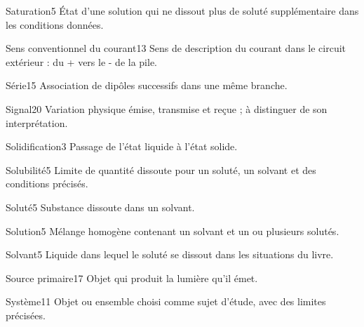 \documentclass[12pt,twoside,openany]{book}
\begin{document}
\begin{pcLexique}{Saturation}{5}
État d’une solution qui ne dissout plus de soluté supplémentaire dans les conditions données.\par
\end{pcLexique}
\begin{pcLexique}{Sens conventionnel du courant}{13}
Sens de description du courant dans le circuit extérieur : du + vers le - de la pile.\par
\end{pcLexique}
\begin{pcLexique}{Série}{15}
Association de dipôles successifs dans une même branche.\par
\end{pcLexique}
\begin{pcLexique}{Signal}{20}
Variation physique émise, transmise et reçue ; à distinguer de son interprétation.\par
\end{pcLexique}
\begin{pcLexique}{Solidification}{3}
Passage de l’état liquide à l’état solide.\par
\end{pcLexique}
\begin{pcLexique}{Solubilité}{5}
Limite de quantité dissoute pour un soluté, un solvant et des conditions précisés.\par
\end{pcLexique}
\begin{pcLexique}{Soluté}{5}
Substance dissoute dans un solvant.\par
\end{pcLexique}
\begin{pcLexique}{Solution}{5}
Mélange homogène contenant un solvant et un ou plusieurs solutés.\par
\end{pcLexique}
\begin{pcLexique}{Solvant}{5}
Liquide dans lequel le soluté se dissout dans les situations du livre.\par
\end{pcLexique}
\begin{pcLexique}{Source primaire}{17}
Objet qui produit la lumière qu’il émet.\par
\end{pcLexique}
\begin{pcLexique}{Système}{11}
Objet ou ensemble choisi comme sujet d’étude, avec des limites précisées.\par
\end{pcLexique}
\end{document}

